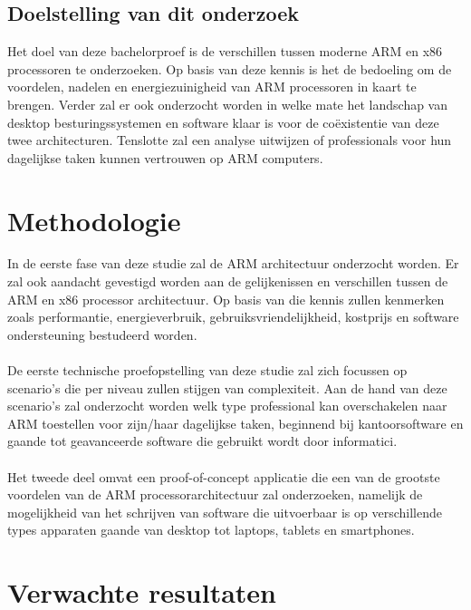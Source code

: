 \subsection{Doelstelling van dit onderzoek}
Het doel van deze bachelorproef is de verschillen tussen moderne ARM en x86 processoren te onderzoeken. Op basis van deze kennis is het de bedoeling om de voordelen, nadelen en energiezuinigheid van ARM processoren in kaart te brengen. Verder zal er ook onderzocht worden in welke mate het landschap van desktop besturingssystemen en software klaar is voor de coëxistentie van deze twee architecturen. Tenslotte zal een analyse uitwijzen of professionals voor hun dagelijkse taken kunnen vertrouwen op ARM computers.

\section{Methodologie}
\label{sec:methodologie}

In de eerste fase van deze studie zal de ARM architectuur onderzocht worden. Er zal ook aandacht gevestigd worden aan de gelijkenissen en verschillen tussen de ARM en x86 processor architectuur. Op basis van die kennis zullen kenmerken zoals performantie, energieverbruik, gebruiksvriendelijkheid, kostprijs en software ondersteuning bestudeerd worden. \\\\
De eerste technische proefopstelling van deze studie zal zich focussen op scenario's die per niveau zullen stijgen van complexiteit. Aan de hand van deze scenario's zal onderzocht worden welk type professional kan overschakelen naar ARM toestellen voor zijn/haar dagelijkse taken, beginnend bij kantoorsoftware en gaande tot geavanceerde software die gebruikt wordt door informatici. \\\\ 
Het tweede deel omvat een proof-of-concept applicatie die een van de grootste voordelen van de ARM processorarchitectuur zal onderzoeken, namelijk de mogelijkheid van het schrijven van software die uitvoerbaar is op verschillende types apparaten gaande van desktop tot laptops, tablets en smartphones.

\section{Verwachte resultaten}
\label{sec:verwachte_resultaten}

